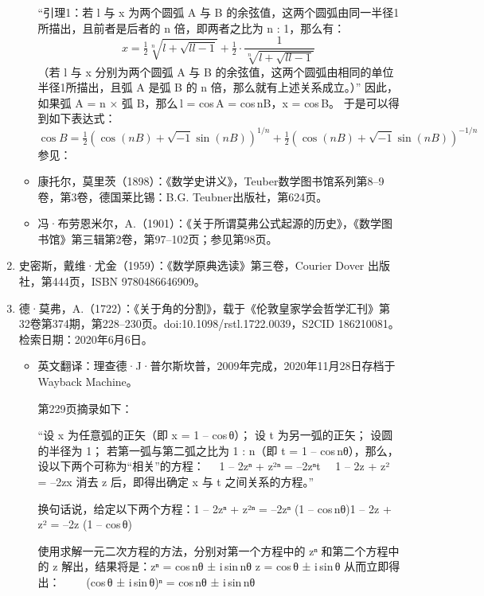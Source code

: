 \begin{enumerate}
\begin{itemize}
“引理1：若 l 与 x 为两个圆弧 A 与 B 的余弦值，这两个圆弧由同一半径1所描出，且前者是后者的 n 倍，即两者之比为 n : 1，那么有：
$$
x = \tfrac{1}{2} \sqrt[n]{l + \sqrt{ll - 1}} + \tfrac{1}{2} \cdot \frac{1}{\sqrt[n]{l + \sqrt{ll - 1}}}~
$$
（若 l 与 x 分别为两个圆弧 A 与 B 的余弦值，这两个圆弧由相同的单位半径1所描出，且弧 A 是弧 B 的 n 倍，那么就有上述关系成立。）”
因此，如果弧 A = n × 弧 B，那么 l = cos A = cos nB，x = cos B。
于是可以得到如下表达式：
$$
\cos B = \tfrac{1}{2} \left( \cos(nB) + \sqrt{-1} \sin(nB) \right)^{1/n} + \tfrac{1}{2} \left( \cos(nB) + \sqrt{-1} \sin(nB) \right)^{-1/n}~
$$
参见：
\item 康托尔，莫里茨（1898）：《数学史讲义》，Teuber数学图书馆系列第8–9卷，第3卷，德国莱比锡：B.G. Teubner出版社，第624页。
\item 冯·布劳恩米尔，A.（1901）：《关于所谓莫弗公式起源的历史》，《数学图书馆》第三辑第2卷，第97–102页；参见第98页。
\end{itemize}
\item 史密斯，戴维·尤金（1959）：《数学原典选读》第三卷，Courier Dover 出版社，第444页，ISBN 9780486646909。
\item 德·莫弗，A.（1722）：《关于角的分割》，载于《伦敦皇家学会哲学汇刊》第32卷第374期，第228–230页。doi:10.1098/rstl.1722.0039，S2CID 186210081。检索日期：2020年6月6日。
\begin{itemize}
\item 英文翻译：理查德·J·普尔斯坎普，2009年完成，2020年11月28日存档于 Wayback Machine。

第229页摘录如下：

“设 x 为任意弧的正矢（即 x = 1 – cos θ）；
设 t 为另一弧的正矢；
设圆的半径为 1；
若第一弧与第二弧之比为 1 : n（即 t = 1 – cos nθ），那么，设以下两个可称为“相关”的方程：
 1 – 2zⁿ + z²ⁿ = –2zⁿt
 1 – 2z + z² = –2zx
消去 z 后，即得出确定 x 与 t 之间关系的方程。”

换句话说，给定以下两个方程：1 – 2zⁿ + z²ⁿ = –2zⁿ (1 – cos nθ)1 – 2z + z² = –2z (1 – cos θ)

使用求解一元二次方程的方法，分别对第一个方程中的 zⁿ 和第二个方程中的 z 解出，结果将是：zⁿ = cos nθ ± i sin nθ z = cos θ ± i sin θ
从而立即得出：
  (cos θ ± i sin θ)ⁿ = cos nθ ± i sin nθ\\


\end{itemize}
\end{enumerate}
